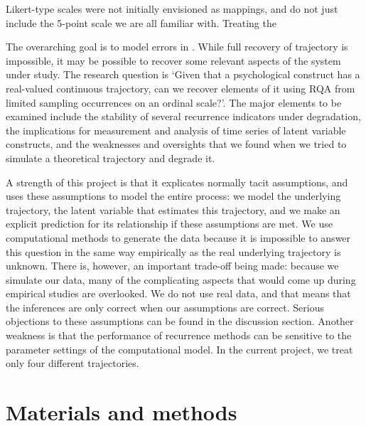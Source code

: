 \documentclass[utf8]{FrontiersinVancouver}
\begin{document}
Likert-type scales were not initially envisioned as mappings, and do not just include the 5-point scale we are all familiar with. Treating the 

The overarching goal is to model errors in . While full recovery of trajectory is impossible, it may be possible to recover some relevant aspects of the system under study. The research question is `Given that a psychological construct has a real-valued continuous trajectory, can we recover elements of it using RQA from limited sampling occurrences on an ordinal scale?'. The major elements to be examined include the stability of several recurrence indicators under degradation, the implications for measurement and analysis of time series of latent variable constructs, and the weaknesses and oversights that we found when we tried to simulate a theoretical trajectory and degrade it.  

A strength of this project is that it explicates normally tacit assumptions, and uses these assumptions to model the entire process: we model the underlying trajectory, the latent variable that estimates this trajectory, and we make an explicit prediction for its relationship if these assumptions are met. We use computational methods to generate the data because it is impossible to answer this question in the same way empirically as the real underlying trajectory is unknown. There is, however, an important trade-off being made: because we simulate our data, many of the complicating aspects that would come up during empirical studies are overlooked. We do not use real data, and that means that the inferences are only correct when our assumptions are correct. Serious objections to these assumptions can be found in the discussion section. Another weakness is that the performance of recurrence methods can be sensitive to the parameter settings of the computational model. In the current project, we treat only four different trajectories.

\section{Materials and methods}
\end{document}
